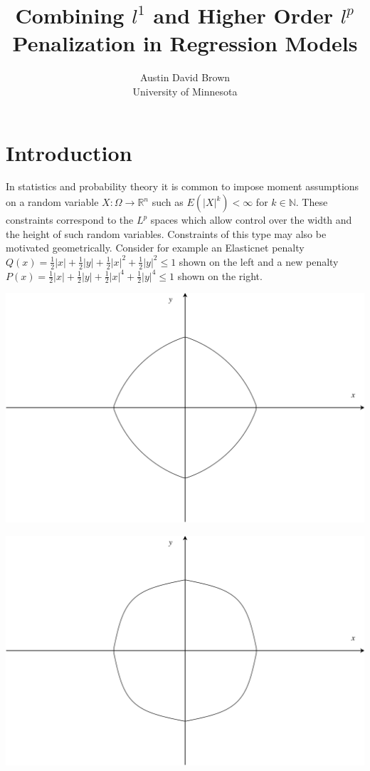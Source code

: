 \documentclass[article]{jss}
\author{Austin David Brown\\University of Minnesota}
\title{Combining $l^1$ and Higher Order $l^p$ Penalization in Regression Models}
\numberwithin{equation}{section}
\newcommand{\R}{\mathbb{R}}
\newcommand{\N}{\mathbb{N}}
\begin{document}
\section{Introduction}

In statistics and probability theory it is common to impose moment assumptions on a random variable $X : \Omega \to \R^n$ such as $E(|X|^k) < \infty$ for $k \in \N$.
These constraints correspond to the $L^p$ spaces which allow control over the width and the height of such random variables.
Constraints of this type may also be motivated geometrically.
Consider for example an Elasticnet penalty $Q(x) = \frac{1}{2} |x| + \frac{1}{2} |y| + \frac{1}{2} |x|^2 + \frac{1}{2} |y|^2 \le 1$
shown on the left and a new penalty $P(x) = \frac{1}{2} |x| + \frac{1}{2} |y| + \frac{1}{2} |x|^4 + \frac{1}{2} |y|^4 \le 1$ shown on the right.

\begin{minipage}{.5\textwidth}
  \centering
  \includegraphics[width=.8\linewidth]{elasticnet.png}
\end{minipage}%
\begin{minipage}{.5\textwidth}
  \centering
  \includegraphics[width=.8\linewidth]{new_penalty_4_moment.png}
\end{minipage}
\end{document}
